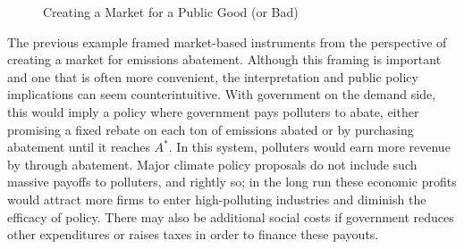 \begin{figure}
\caption{Creating a Market for a Public Good (or Bad)}
\centering
{}
\hspace{.01cm}
\end{figure}

The previous example framed market-based instruments from the perspective of creating a market for emissions abatement. 
Although this framing is important and one that is often more convenient, the interpretation and public policy implications can seem counterintuitive. With government on the demand side, this would imply a policy where government pays polluters to abate, either promising a fixed rebate on each ton of emissions abated or by purchasing abatement until it reaches $A^*$. In this system, polluters would earn more revenue by through abatement. Major climate policy proposals do not include such massive payoffs to polluters, and rightly so; in the long run these economic profits would attract more firms to enter high-polluting industries and diminish the efficacy of policy. There may also be additional social costs if government reduces other expenditures or raises taxes in order to finance these payouts. 

